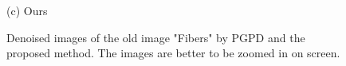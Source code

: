 \documentclass[runningheads]{llncs}
\begin{document}
\begin{figure}
{\begin{minipage}[t]{0.33\textwidth}
{\footnotesize (c) Ours }
\end{minipage}
}
\caption{Denoised images of the old image "Fibers" by PGPD and the proposed method. The images are better to be zoomed in on screen.}
\label{fig37}
\end{figure}
\end{document}
